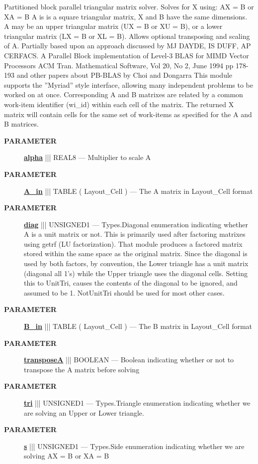 Partitioned block parallel triangular matrix solver. Solves for X using: AX = B or XA = B A is is a square triangular matrix, X and B have the same dimensions. A may be an upper triangular matrix (UX = B or XU = B), or a lower triangular matrix (LX = B or XL = B). Allows optional transposing and scaling of A. Partially based upon an approach discussed by MJ DAYDE, IS DUFF, AP CERFACS. A Parallel Block implementation of Level-3 BLAS for MIMD Vector Processors ACM Tran. Mathematical Software, Vol 20, No 2, June 1994 pp 178-193 and other papers about PB-BLAS by Choi and Dongarra This module supports the ''Myriad'' style interface, allowing many independent problems to be worked on at once. Corresponding A and B matrixes are related by a common work-item identifier (wi\_id) within each cell of the matrix. The returned X matrix will contain cells for the same set of work-items as specified for the A and B matrices.






\par
\begin{description}
\item [\colorbox{tagtype}{\color{white} \textbf{\textsf{PARAMETER}}}] \textbf{\underline{alpha}} ||| REAL8 --- Multiplier to scale A
\item [\colorbox{tagtype}{\color{white} \textbf{\textsf{PARAMETER}}}] \textbf{\underline{A\_in}} ||| TABLE ( Layout\_Cell ) --- The A matrix in Layout\_Cell format
\item [\colorbox{tagtype}{\color{white} \textbf{\textsf{PARAMETER}}}] \textbf{\underline{diag}} ||| UNSIGNED1 --- Types.Diagonal enumeration indicating whether A is a unit matrix or not. This is primarily used after factoring matrixes using getrf (LU factorization). That module produces a factored matrix stored within the same space as the original matrix. Since the diagonal is used by both factors, by convention, the Lower triangle has a unit matrix (diagonal all 1's) while the Upper triangle uses the diagonal cells. Setting this to UnitTri, causes the contents of the diagonal to be ignored, and assumed to be 1. NotUnitTri should be used for most other cases.
\item [\colorbox{tagtype}{\color{white} \textbf{\textsf{PARAMETER}}}] \textbf{\underline{B\_in}} ||| TABLE ( Layout\_Cell ) --- The B matrix in Layout\_Cell format
\item [\colorbox{tagtype}{\color{white} \textbf{\textsf{PARAMETER}}}] \textbf{\underline{transposeA}} ||| BOOLEAN --- Boolean indicating whether or not to transpose the A matrix before solving
\item [\colorbox{tagtype}{\color{white} \textbf{\textsf{PARAMETER}}}] \textbf{\underline{tri}} ||| UNSIGNED1 --- Types.Triangle enumeration indicating whether we are solving an Upper or Lower triangle.
\item [\colorbox{tagtype}{\color{white} \textbf{\textsf{PARAMETER}}}] \textbf{\underline{s}} ||| UNSIGNED1 --- Types.Side enumeration indicating whether we are solving AX = B or XA = B
\end{description}







